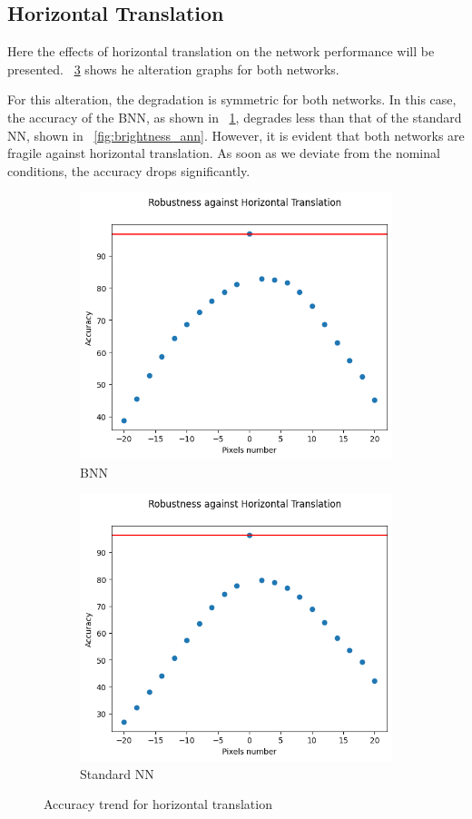 \subsection{Horizontal Translation}

Here the effects of horizontal translation on the network performance will be presented. \Fig~\ref{fig:acc_ht_wu} shows he alteration graphs for both networks.

For this alteration, the degradation is symmetric for both networks. In this case, the accuracy of the BNN, as shown in \Fig~\ref{fig:ht_acc_wu_bnn}, degrades less than that of the standard NN, shown in \Fig~\ref{fig:brightness_ann}. However, it is evident that both networks are fragile against horizontal translation. As soon as we deviate from the nominal conditions, the accuracy drops significantly.

\begin{figure}[h]
	\centering
	\begin{subfigure}{.5\textwidth}
		\centering
		\includegraphics[width=0.8\linewidth]{ImageFiles/EvalBNN/HT/WU/acc}
		\caption{BNN}
		\label{fig:ht_acc_wu_bnn}
	\end{subfigure}%
	\begin{subfigure}{.5\textwidth}
		\centering
		\includegraphics[width=0.8\linewidth]{ImageFiles/EvalANN/horiz_trans_ann}
		\caption{Standard NN}
		\label{fig:horiz_trans_ann}
	\end{subfigure}
	\caption{Accuracy trend for horizontal translation}
	\label{fig:acc_ht_wu}
\end{figure}

